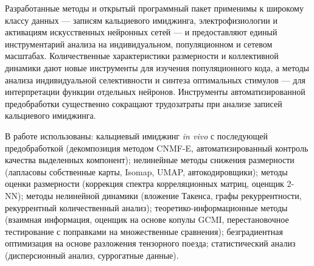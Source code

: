 {\influence} Разработанные методы и открытый программный пакет применимы
к широкому классу данных --- записям кальциевого имиджинга, электрофизиологии
и активациям искусственных нейронных сетей --- и предоставляют единый
инструментарий анализа на индивидуальном, популяционном и сетевом масштабах.
Количественные характеристики размерности и коллективной динамики дают новые
инструменты для изучения популяционного кода, а методы анализа индивидуальной
селективности и синтеза оптимальных стимулов --- для интерпретации функции
отдельных нейронов. Инструменты автоматизированной предобработки существенно
сокращают трудозатраты при анализе записей кальциевого имиджинга.

{\methods} В работе использованы: кальциевый имиджинг \textit{in vivo}
с последующей предобработкой (декомпозиция методом CNMF-E, автоматизированный
контроль качества выделенных компонент); нелинейные методы снижения
размерности (лапласовы собственные карты, Isomap, UMAP, автокодировщики);
методы оценки размерности (коррекция спектра корреляционных матриц, оценщик
2-NN); методы нелинейной динамики (вложение Такенса, графы рекуррентности,
рекуррентный количественный анализ); теоретико-информационные методы
(взаимная информация, оценщик на основе копулы GCMI, перестановочное
тестирование с поправками на множественные сравнения); безградиентная
оптимизация на основе разложения тензорного поезда; статистический анализ
(дисперсионный анализ, суррогатные данные).

